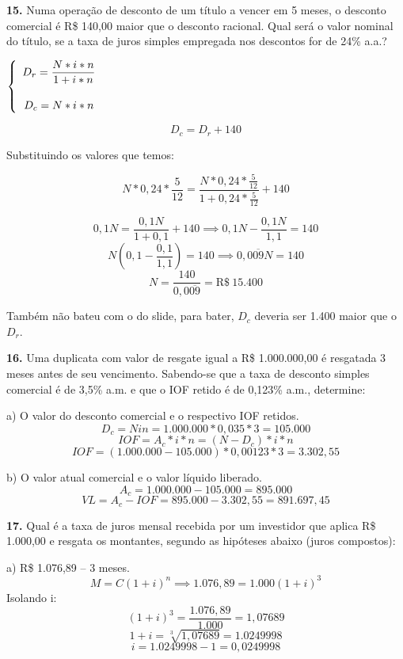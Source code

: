 \documentclass[12pt,a4paper]{article}
\begin{document}
  \textbf{15.} Numa operação de desconto de um título a vencer em 5 meses, o desconto comercial é 
  R\$ 140,00 maior que o desconto racional. Qual será o valor nominal do título, se a
  taxa de juros simples empregada nos descontos for de 24\% a.a.?
  \vspace*{.5cm}

  \(
    \left\{ 
      \begin{array}{clll}
        \vspace*{.5cm}
        D_r = \dfrac{N*i*n}{1+i*n} \\
        D_c = N*i*n
      \end{array}
    \right.
  \)

  \[
  D_c = D_r + 140
  \]

  Substituindo os valores que temos:

  \[
    N*0,24*\frac{5}{12} = \frac{N*0,24*\frac{5}{12}}{1+0,24*\frac{5}{12}} + 140
  \]

  \[
    0,1N = \frac{0,1N}{1 + 0,1} + 140 \implies 0,1N - \frac{0,1N}{1,1} = 140
  \]
  \[
    N\left( 0,1 - \frac{0,1}{1,1} \right) = 140 \implies 0,0\overline{09}N = 140 
  \]
  \[
    N = \frac{140}{0,0\overline{09}} = \text{R\$}\ 15.400
  \]

  Também não bateu com o do slide, para bater, $D_c$ deveria ser 1.400 maior que o $D_r$.

  \textbf{16.} Uma duplicata com valor de resgate igual a R\$ 1.000.000,00 é resgatada 3 meses
  antes de seu vencimento. Sabendo-se que a taxa de desconto simples comercial é de 3,5\%
  a.m. e que o IOF retido é de 0,123\% a.m., determine:

  \hspace*{.5cm} a) O valor do desconto comercial e o respectivo IOF retidos.
  \[
    D_c = Nin = 1.000.000*0,035*3 = 105.000
  \]
  \[
    IOF = A_c*i*n = (N - D_c)*i*n
  \]
  \[
    IOF = (1.000.000 - 105.000)*0,00123*3 = 3.302,55
  \]
        
  \hspace*{.5cm} b) O valor atual comercial e o valor líquido liberado.
  \[
    A_c = 1.000.000 - 105.000 = 895.000
  \]
  \[
    VL = A_c - IOF = 895.000 - 3.302,55 = 891.697,45
  \]
  
  \textbf{17.} Qual é a taxa de juros mensal recebida por um investidor que aplica R\$ 1.000,00
  e resgata os montantes, segundo as hipóteses abaixo (juros compostos):

  \hspace*{.5cm} a) R\$ 1.076,89 – 3 meses.
  \[
    M = C (1 + i)^n \implies 1.076,89 = 1.000(1 + i)^3
  \]
  Isolando i:
  \[
    (1 + i)^3 = \frac{1.076,89}{1.000} = 1,07689
  \]
  \[
    1+i = \sqrt[3]{1,07689} = 1.0249998
  \]
  \[
    i = 1.0249998 - 1 = 0,0249998
  \]
\end{document}
